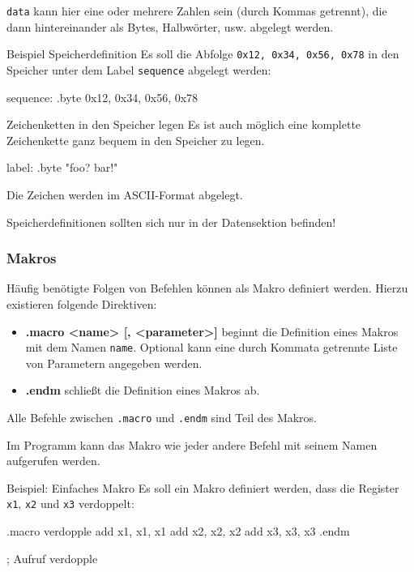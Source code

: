 \texttt{data} kann hier eine oder mehrere Zahlen sein (durch Kommas getrennt), die dann hintereinander als Bytes, Halbwörter, usw. abgelegt werden.

\begin{exampleblock}{Beispiel Speicherdefinition}
	Es soll die Abfolge \texttt{0x12, 0x34, 0x56, 0x78} in den Speicher unter dem Label \texttt{sequence} abgelegt werden:
	\begin{riscv}
		sequence: .byte 0x12, 0x34, 0x56, 0x78
	\end{riscv}
\end{exampleblock}

\begin{infoblock}{Zeichenketten in den Speicher legen}
	Es ist auch möglich eine komplette Zeichenkette ganz bequem in den Speicher zu legen.
	\begin{riscv}
		label: .byte "foo? bar!"
	\end{riscv}
	Die Zeichen werden im ASCII-Format abgelegt.
\end{infoblock}

\begin{warningblock}
	Speicherdefinitionen sollten sich nur in der Datensektion befinden!
\end{warningblock}

\subsubsection{Makros}

Häufig benötigte Folgen von Befehlen können als Makro definiert werden. Hierzu
existieren folgende Direktiven:

\begin{itemize}
	\item \textbf{.macro <name> [, <parameter>]} beginnt die Definition eines
	Makros mit dem Namen \texttt{name}. Optional kann eine durch Kommata getrennte Liste
	von Parametern angegeben werden.
	\item \textbf{.endm} schließt die Definition eines Makros ab.
\end{itemize}

Alle Befehle zwischen \texttt{.macro} und \texttt{.endm} sind Teil des Makros.

Im Programm kann das Makro wie jeder andere Befehl mit seinem Namen aufgerufen
werden.

\begin{exampleblock}{Beispiel: Einfaches Makro}
	Es soll ein Makro definiert werden, dass die Register \texttt{x1}, \texttt{x2}
	und \texttt{x3} verdoppelt:
	\begin{riscv}
		.macro verdopple
		add x1, x1, x1
		add x2, x2, x2
		add x3, x3, x3
		.endm

		; Aufruf
		verdopple
	\end{riscv}
\end{exampleblock}

